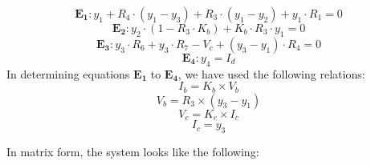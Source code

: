 \begin{equation*}
  \mathbf{E_1} : y_1 + R_4\cdot(y_1 - y_3) + R_3 \cdot(y_1 - y_2) + y_1 \cdot R_1 = 0
  \label{eq:kvlA}
\end{equation*}
\begin{equation*}
  \mathbf{E_2} : y_2 \cdot (1-R_3 \cdot K_b) + K_b \cdot R_3 \cdot y_1 = 0
  \label{eq:kvlB}
\end{equation*}
\begin{equation*}
  \mathbf{E_3} : y_3 \cdot R_6 + y_3 \cdot R_7 - V_c + (y_3 - y_1) \cdot R_4 = 0
  \label{eq:kvlC}
\end{equation*}
\begin{equation*}
  \mathbf{E_4} : y_4 = I_d
  \label{eq:kvlD}
\end{equation*}
In determining equations $\mathbf{E_1}$ to $\mathbf{E_4}$, we have used the following relations:
\begin{equation*}
  I_b=K_b \times V_b
  \label{eq:extra1}
\end{equation*}
\begin{equation*}
  V_b= R_3 \times (y_3-y_1)
  \label{eq:extra1}
\end{equation*}
\begin{equation*}
  V_c=K_c \times I_c
  \label{eq:extra2}
\end{equation*}
\begin{equation*}
    I_c = y_3
\end{equation*}


In matrix form, the system looks like the following:

\vspace{10mm}


